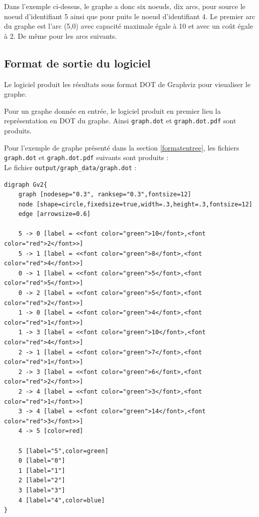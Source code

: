 \documentclass[titlepage]{article}
\begin{document}
Dans l'exemple ci-dessus, le graphe a donc six noeuds, dix arcs, pour source le noeud d'identifiant 5 ainsi que pour puits le noeud d'identifiant 4. Le premier arc du graphe est l'arc (5,0) avec capacité maximale égale à 10 et avec un coût égale à 2. De même pour les arcs suivants.



\clearpage


\subsection{Format de sortie du logiciel}

Le logiciel produit les résultats sous format DOT de Graphviz pour visualiser le graphe. 

Pour un graphe donnée en entrée, le logiciel produit en premier lieu la représentation en DOT du graphe. Ainsi \texttt{graph.dot} et \texttt{graph.dot.pdf} sont produits.

Pour l'exemple de graphe présenté dans la section \ref{formatentree}, les fichiers \texttt{graph.dot} et \texttt{graph.dot.pdf} suivants sont produits :\\
Le fichier \texttt{output/graph\_data/graph.dot} :

\begin{verbatim}
digraph Gv2{
    graph [nodesep="0.3", ranksep="0.3",fontsize=12]
    node [shape=circle,fixedsize=true,width=.3,height=.3,fontsize=12]
    edge [arrowsize=0.6]

    5 -> 0 [label = <<font color="green">10</font>,<font color="red">2</font>>]
    5 -> 1 [label = <<font color="green">8</font>,<font color="red">4</font>>]
    0 -> 1 [label = <<font color="green">5</font>,<font color="red">5</font>>]
    0 -> 2 [label = <<font color="green">5</font>,<font color="red">2</font>>]
    1 -> 0 [label = <<font color="green">4</font>,<font color="red">1</font>>]
    1 -> 3 [label = <<font color="green">10</font>,<font color="red">4</font>>]
    2 -> 1 [label = <<font color="green">7</font>,<font color="red">1</font>>]
    2 -> 3 [label = <<font color="green">6</font>,<font color="red">2</font>>]
    2 -> 4 [label = <<font color="green">3</font>,<font color="red">1</font>>]
    3 -> 4 [label = <<font color="green">14</font>,<font color="red">3</font>>]
    4 -> 5 [color=red]

    5 [label="5",color=green]
    0 [label="0"]
    1 [label="1"]
    2 [label="2"]
    3 [label="3"]
    4 [label="4",color=blue]
}
\end{verbatim}
\end{document}
